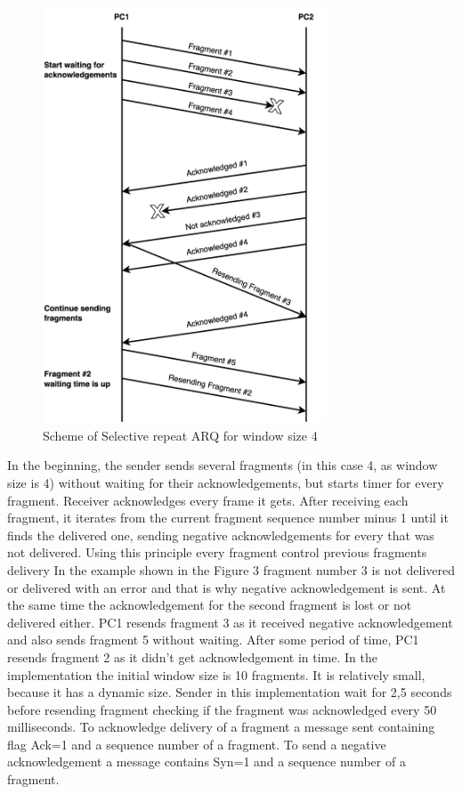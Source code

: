 \documentclass{article}
\begin{document}
\begin{figure}[!h]
    \centering
    \includegraphics[width=0.75\textwidth]{images/arq.png}
    \caption{Scheme of Selective repeat ARQ for window size 4}
    \label{fig:mesh1}
\end{figure}

In the beginning, the sender sends several fragments (in this case 4, as window size is 4) without waiting for their acknowledgements, but starts timer for every fragment.  Receiver acknowledges every frame it gets. After receiving each fragment, it iterates from the current fragment sequence number minus 1 until it finds the delivered one, sending negative acknowledgements for every that was not delivered. Using this principle every fragment control previous fragments delivery    In the example shown in the Figure 3 fragment number 3 is not delivered or delivered with an error and that is why negative acknowledgement is sent. At the same time the acknowledgement for the second fragment is lost or not delivered  either.  PC1 resends fragment 3 as it received negative acknowledgement and also sends fragment 5  without waiting. After some period of time, PC1 resends fragment 2 as it didn't get acknowledgement in time.\newline
In the implementation the initial window size is 10 fragments. It is relatively small, because it has a dynamic size. Sender in this implementation wait for 2,5 seconds before resending fragment checking if the fragment was acknowledged every 50 milliseconds.
\newline
To acknowledge delivery of a fragment a message sent containing flag Ack=1 and a sequence number of a fragment. To send a negative acknowledgement a message contains Syn=1 and a sequence number of a fragment.
\end{document}
